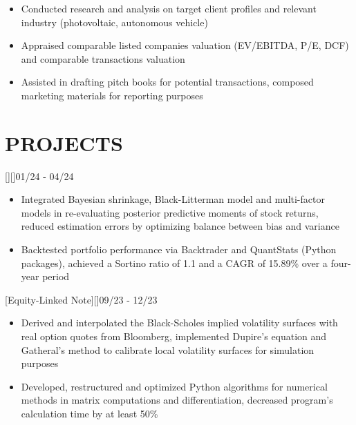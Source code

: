 \documentclass[cmu]{resume}
\begin{document}
    \begin{itemize}
        \item Conducted research and analysis on target client profiles and relevant industry (photovoltaic, autonomous vehicle)
        \item Appraised comparable listed companies valuation (EV/EBITDA, P/E, DCF) and comparable transactions valuation
        \item Assisted in drafting pitch books for potential transactions, composed marketing materials for reporting purposes
    \end{itemize}
    \section{PROJECTS}
    [][\href{https://github.com/laurence1126/Quant-Trading-Strategy}{\githubIcon}]{01/24 - 04/24}
    \begin{itemize}
        \item Integrated Bayesian shrinkage, Black-Litterman model and multi-factor models in re-evaluating posterior predictive moments of stock returns, reduced estimation errors by optimizing balance between bias and variance
        \item Backtested portfolio performance via Backtrader and QuantStats (Python packages), achieved a Sortino ratio of 1.1 and a CAGR of 15.89\% over a four-year period
    \end{itemize}

    [Equity-Linked Note][\href{https://github.com/laurence1126/Equity-Linked-Note-Pricer}{\githubIcon}]{09/23 - 12/23}
    \begin{itemize}
        \item Derived and interpolated the Black-Scholes implied volatility surfaces with real option quotes from Bloomberg, implemented Dupire's equation and Gatheral's method to calibrate local volatility surfaces for simulation purposes
        \item Developed, restructured and optimized Python algorithms for numerical methods in matrix computations and differentiation, decreased program's calculation time by at least 50\%
    \end{itemize}
\end{document}
